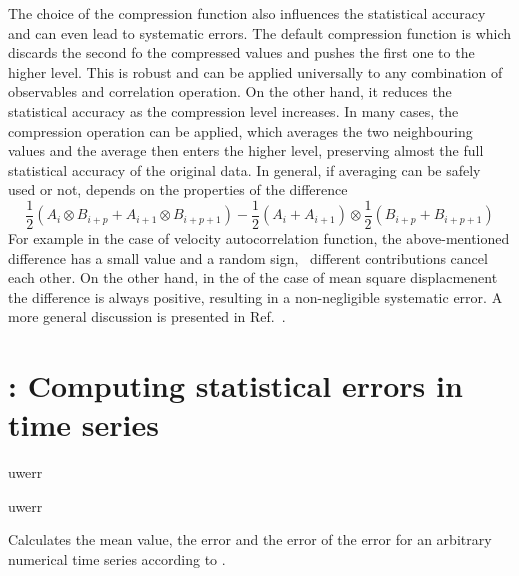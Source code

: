 The choice of the compression function also influences the statistical
accuracy and can even lead to systematic errors. The default compression 
function is  which discards the second fo the compressed 
values and pushes the first one to the higher level. This is robust and 
can be applied universally to any combination of observables and
correlation operation. On the other hand, it reduces the
statistical accuracy as the compression level increases.
In many cases, the  compression operation
can be applied, which averages the two neighbouring values
and the average then enters the higher level, preserving
almost the full statistical accuracy of the original data. 
In general, if averaging can be safely used or not, depends on the 
properties of the difference
\begin{equation} 
\frac{1}{2} (A_i \otimes B_{i+p} + A_{i+1} \otimes B_{i+p+1} ) - 
\frac{1}{2} (A_i + A_{i+1} ) \otimes \frac{1}{2} (B_{i+p} +  B_{i+p+1})
\label{eq:difference}
\end{equation} 
For example in the case of velocity autocorrelation function, the
above-mentioned difference has a small value and a random sign, \ie\ 
different contributions cancel each other. On the other hand, in the
of the case of mean square displacmenent the difference is always positive,
resulting in a non-negligible systematic error. A more general
discussion is presented in Ref.~\cite{ramirez10a}.


\section{: Computing statistical errors in time series}
\label{sec:uwerr}

\begin{essyntax}
   uwerr   
    

   uwerr   
    
\end{essyntax}
Calculates the mean value, the error and the error of the error for an
arbitrary numerical time series according to \citet{wolff04a}.

